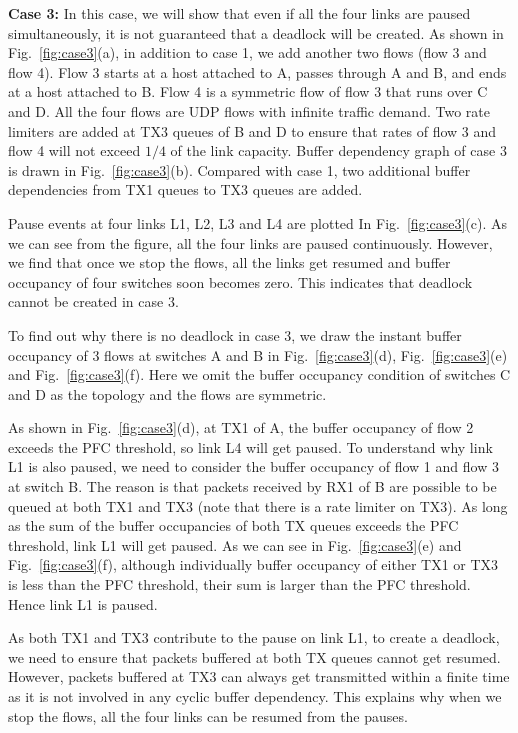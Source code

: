 \textbf{Case 3:} In this case, we will show that even if all the four links are paused simultaneously, it is not guaranteed that a deadlock will be created. As shown in Fig.~\ref{fig:case3}(a), in addition to case 1, we add another two flows (flow 3 and flow 4). Flow 3 starts at a host attached to A, passes through A and B, and ends at a host attached to B. Flow 4 is a symmetric flow of flow 3 that runs over C and D. All the four flows are UDP flows with infinite traffic demand. Two rate limiters are added at TX3 queues of B and D to ensure that rates of flow 3 and flow 4 will not exceed $1/4$ of the link capacity. Buffer dependency graph of case 3 is drawn in Fig.~\ref{fig:case3}(b). Compared with case 1, two additional buffer dependencies from TX1 queues to TX3 queues are added.

Pause events at four links L1, L2, L3 and L4 are plotted In Fig.~\ref{fig:case3}(c).  As we can see from the figure, all the four links are paused continuously. However, we find that once we stop the flows, all the links get resumed and buffer occupancy of four switches soon becomes zero. This indicates that deadlock cannot be created in case 3.

To find out why there is no deadlock in case 3, we draw the instant buffer occupancy of 3 flows at switches A and B in Fig.~\ref{fig:case3}(d), Fig.~\ref{fig:case3}(e) and Fig.~\ref{fig:case3}(f). Here we omit the buffer occupancy condition of switches C and D as the topology and the flows are symmetric.

As shown in Fig.~\ref{fig:case3}(d), at TX1 of A, the buffer occupancy of flow 2 exceeds the PFC threshold, so link L4 will get paused. To understand why link L1 is also paused, we need to consider the buffer occupancy of flow 1 and flow 3 at switch B. The reason is that packets received by RX1 of B are possible to be queued at both TX1 and TX3 (note that there is a rate limiter on TX3). As long as the sum of the buffer occupancies of both TX queues exceeds the PFC threshold, link L1 will get paused. As we can see in Fig.~\ref{fig:case3}(e) and Fig.~\ref{fig:case3}(f), although individually buffer occupancy of either TX1 or TX3 is less than the PFC threshold, their sum is larger than the PFC threshold. Hence link L1 is paused.

As both TX1 and TX3 contribute to the pause on link L1, to create a deadlock, we need to ensure that packets buffered at both TX queues cannot get resumed. However, packets buffered at TX3 can always get transmitted within a finite time as it is not involved in any cyclic buffer dependency. This explains why when we stop the flows, all the four links can be resumed from the pauses. 


